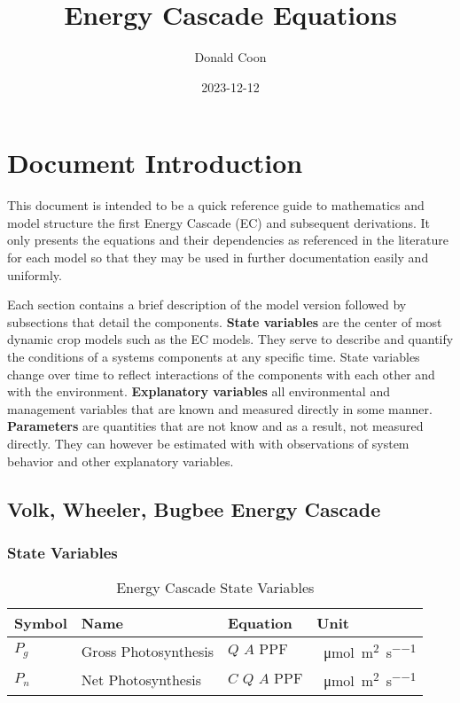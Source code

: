 \documentclass{article}
\title{Energy Cascade Equations}
\date{2023-12-12}
\author{Donald Coon}
\begin{document}
\maketitle
{}
\newpage

\tableofcontents
\newpage
{}

\section{Document Introduction}
This document is intended to be a quick reference guide to mathematics and model structure the first Energy Cascade (EC) and subsequent derivations. It only presents the equations and their dependencies as referenced in the literature for each model so that they may be used in further documentation easily and uniformly. 

Each section contains a brief description of the model version followed by subsections that detail the components. \textbf{State variables} are the center of most dynamic crop models such as the EC models. They serve to describe and quantify the conditions of a systems components at any specific time. State variables change over time to reflect interactions of the components with each other and with the environment. \textbf{Explanatory variables} all environmental and management variables that are known and measured directly in some manner. \textbf{Parameters} are quantities that are not know and as a result, not measured directly. They can however be estimated with with observations of system behavior and other explanatory variables.

\subsection{Volk, Wheeler, Bugbee Energy Cascade}
\subsubsection{State Variables}
\begin{table}[h!]
	\begin{center}
		\caption{Energy Cascade State Variables}
		\label{tab:table1}
		\begin{tabular}{l|l|l|l}
			\textbf{Symbol} & \textbf{Name} & \textbf{Equation} & \textbf{Unit}\\
			\hline
			$P_g$ & Gross Photosynthesis& $\textit{Q A } \text{PPF}$  &  \SI{}{\micro\mol\per\metre\squared\per\second}\\
			$P_n$  & Net Photosynthesis &  $\textit{C Q A } \text{PPF}$ & \SI{}{\micro\mol\per\metre\squared\per\second}\\ 
		\end{tabular}
	\end{center}
\end{table}
		
\end{document}
